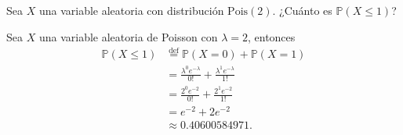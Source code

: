 \question
	Sea $X$ una variable aleatoria con distribución $\mathrm{Pois}(2)$. ¿Cuánto es $\mathds{P}\left(X\le1\right)$?

	\begin{solutionordottedlines}
		Sea $X$ una variable aleatoria de Poisson con $\lambda=2$, entonces
		\begin{align*}
			\mathds{P}\left(X\le1\right)
			&\stackrel{\text{def}}{=}\mathds{P}\left(X=0\right)+\mathds{P}\left(X=1\right)\\
			&=\frac{\lambda^{0}e^{-\lambda}}{0!}+\frac{\lambda^{1}e^{-\lambda}}{1!}\\
			&=\frac{2^{0}e^{-2}}{0!}+\frac{2^{1}e^{-2}}{1!}\\
			&=e^{-2}+2e^{-2}\\
			&\approx\num{0.40600584971}.
		\end{align*}
	\end{solutionordottedlines}